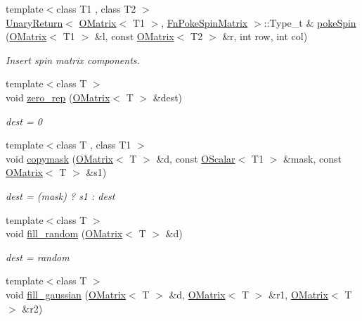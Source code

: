 \begin{DoxyCompactItemize}
\item 
{\footnotesize template$<$class T1 , class T2 $>$ }\\\mbox{\hyperlink{structENSEM_1_1UnaryReturn}{Unary\+Return}}$<$ \mbox{\hyperlink{classENSEM_1_1OMatrix}{O\+Matrix}}$<$ T1 $>$, \mbox{\hyperlink{structENSEM_1_1FnPokeSpinMatrix}{Fn\+Poke\+Spin\+Matrix}} $>$\+::Type\+\_\+t \& \mbox{\hyperlink{group__obsmatrix_gade958f6bfe55cda547000e6badb137c7}{poke\+Spin}} (\mbox{\hyperlink{classENSEM_1_1OMatrix}{O\+Matrix}}$<$ T1 $>$ \&l, const \mbox{\hyperlink{classENSEM_1_1OMatrix}{O\+Matrix}}$<$ T2 $>$ \&r, int row, int col)
\begin{DoxyCompactList}\small\item\em Insert spin matrix components. \end{DoxyCompactList}\item 
{\footnotesize template$<$class T $>$ }\\void \mbox{\hyperlink{group__obsmatrix_gaf3d502e6c7fccd147d8023eda09b31b4}{zero\+\_\+rep}} (\mbox{\hyperlink{classENSEM_1_1OMatrix}{O\+Matrix}}$<$ T $>$ \&dest)
\begin{DoxyCompactList}\small\item\em dest = 0 \end{DoxyCompactList}\item 
{\footnotesize template$<$class T , class T1 $>$ }\\void \mbox{\hyperlink{group__obsmatrix_gaa09c3011b1e6555dcc6e4f9b51d1f5de}{copymask}} (\mbox{\hyperlink{classENSEM_1_1OMatrix}{O\+Matrix}}$<$ T $>$ \&d, const \mbox{\hyperlink{classENSEM_1_1OScalar}{O\+Scalar}}$<$ T1 $>$ \&mask, const \mbox{\hyperlink{classENSEM_1_1OMatrix}{O\+Matrix}}$<$ T $>$ \&s1)
\begin{DoxyCompactList}\small\item\em dest = (mask) ? s1 \+: dest \end{DoxyCompactList}\item 
{\footnotesize template$<$class T $>$ }\\void \mbox{\hyperlink{group__obsmatrix_ga3fed53cf2a765d06a2ba3d79f2516f35}{fill\+\_\+random}} (\mbox{\hyperlink{classENSEM_1_1OMatrix}{O\+Matrix}}$<$ T $>$ \&d)
\begin{DoxyCompactList}\small\item\em dest = random \end{DoxyCompactList}\item 
{\footnotesize template$<$class T $>$ }\\void \mbox{\hyperlink{group__obsmatrix_ga5abeb3bfc7329fc57387aefff992eb94}{fill\+\_\+gaussian}} (\mbox{\hyperlink{classENSEM_1_1OMatrix}{O\+Matrix}}$<$ T $>$ \&d, \mbox{\hyperlink{classENSEM_1_1OMatrix}{O\+Matrix}}$<$ T $>$ \&r1, \mbox{\hyperlink{classENSEM_1_1OMatrix}{O\+Matrix}}$<$ T $>$ \&r2)

\end{DoxyCompactItemize}
